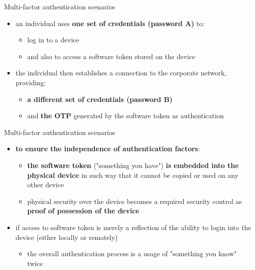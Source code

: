 \documentclass[pdf]{beamer}
\begin{document}
\begin{frame}{Multi-factor authentication scenarios}
\begin{itemize}
\item
an individual uses \textbf{one set of credentials (password A)} to:
\begin{itemize}
\item
log in to a device
\item
and also to access a software token stored on the device
\end{itemize}
\item
the individual then establishes a connection to the corporate network, providing:
\begin{itemize}
\item
\textbf{a different set of credentials (password B)}
\item
and \textbf{the OTP} generated by the software token as authentication
\end{itemize}
\end{itemize}
\end{frame}



\begin{frame}{Multi-factor authentication scenarios}
\begin{itemize}
\item
\textbf{to ensure the independence of authentication factors}:

\begin{itemize}
\item
\textbf{the software token} ("something you have") \textbf{is embedded into the physical device} in such way that it cannot be copied or used on any other device
\item
physical security over the device becomes a required security control as \textbf{proof of possession of the device}
\end{itemize}

\item
if access to software token is merely a reflection of the ability to login into the device (either locally or remotely)
\begin{itemize}
\item
the overall authentication process is a usage of "something you know" twice
\end{itemize}

\end{itemize}
\end{frame}
\end{document}
